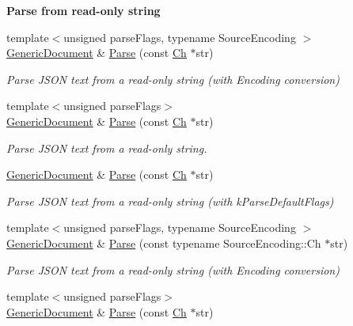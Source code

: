 \begin{Indent}\textbf{ Parse from read-\/only string}\par
\begin{DoxyCompactItemize}
\item 
{\footnotesize template$<$unsigned parse\+Flags, typename Source\+Encoding $>$ }\\\hyperlink{classGenericDocument}{Generic\+Document} \& \hyperlink{classGenericDocument_aebd4e7fddd80c1e1174837aee6d2159b}{Parse} (const \hyperlink{classGenericValue_ade0e0ce64ccd5d852da57a35e720bafb}{Ch} $\ast$str)
\begin{DoxyCompactList}\small\item\em Parse J\+S\+ON text from a read-\/only string (with Encoding conversion) \end{DoxyCompactList}\item 
{\footnotesize template$<$unsigned parse\+Flags$>$ }\\\hyperlink{classGenericDocument}{Generic\+Document} \& \hyperlink{classGenericDocument_a5e377f840009b5cee6757be29525ce0b}{Parse} (const \hyperlink{classGenericValue_ade0e0ce64ccd5d852da57a35e720bafb}{Ch} $\ast$str)
\begin{DoxyCompactList}\small\item\em Parse J\+S\+ON text from a read-\/only string. \end{DoxyCompactList}\item 
\hyperlink{classGenericDocument}{Generic\+Document} \& \hyperlink{classGenericDocument_a49ae6de6fd0bc820d9864a106c10b4da}{Parse} (const \hyperlink{classGenericValue_ade0e0ce64ccd5d852da57a35e720bafb}{Ch} $\ast$str)
\begin{DoxyCompactList}\small\item\em Parse J\+S\+ON text from a read-\/only string (with k\+Parse\+Default\+Flags) \end{DoxyCompactList}\item 
{\footnotesize template$<$unsigned parse\+Flags, typename Source\+Encoding $>$ }\\\hyperlink{classGenericDocument}{Generic\+Document} \& \hyperlink{classGenericDocument_aadee36db7064cc9894a75c848831cdae}{Parse} (const typename Source\+Encoding\+::\+Ch $\ast$str)
\begin{DoxyCompactList}\small\item\em Parse J\+S\+ON text from a read-\/only string (with Encoding conversion) \end{DoxyCompactList}\item 
{\footnotesize template$<$unsigned parse\+Flags$>$ }\\\hyperlink{classGenericDocument}{Generic\+Document} \& \hyperlink{classGenericDocument_a5e377f840009b5cee6757be29525ce0b}{Parse} (const \hyperlink{classGenericValue_ade0e0ce64ccd5d852da57a35e720bafb}{Ch} $\ast$str)

\end{DoxyCompactItemize}
\end{Indent}
